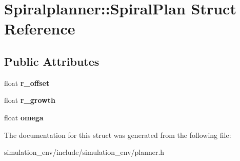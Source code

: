 \hypertarget{structSpiralplanner_1_1SpiralPlan}{}\section{Spiralplanner\+:\+:Spiral\+Plan Struct Reference}
\label{structSpiralplanner_1_1SpiralPlan}
\subsection*{Public Attributes}
\begin{DoxyCompactItemize}
\item 
float {\bfseries r\+\_\+offset}\hypertarget{structSpiralplanner_1_1SpiralPlan_aa854c769a18405f2b69023063f4228a0}{}\label{structSpiralplanner_1_1SpiralPlan_aa854c769a18405f2b69023063f4228a0}

\item 
float {\bfseries r\+\_\+growth}\hypertarget{structSpiralplanner_1_1SpiralPlan_a64b2ae98f74cac59a2d35cc44f07f2d9}{}\label{structSpiralplanner_1_1SpiralPlan_a64b2ae98f74cac59a2d35cc44f07f2d9}

\item 
float {\bfseries omega}\hypertarget{structSpiralplanner_1_1SpiralPlan_a8cb0e1eca79013b8a84d4bf9162cb481}{}\label{structSpiralplanner_1_1SpiralPlan_a8cb0e1eca79013b8a84d4bf9162cb481}

\end{DoxyCompactItemize}


The documentation for this struct was generated from the following file\+:\begin{DoxyCompactItemize}
\item 
simulation\+\_\+env/include/simulation\+\_\+env/planner.\+h\end{DoxyCompactItemize}
